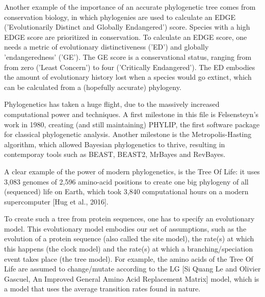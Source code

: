 %
%

Another example of the importance of an accurate phylogenetic tree 
comes from conservation biology, in which phylogenies are used to
calculate an EDGE ('Evolutionarily Distinct and Globally Endangered') 
score. Species with a high EDGE score are prioritized in conservation.
To calculate an EDGE score, one needs a metric of evolutionary 
distinctiveness ('ED') and globally 'endangeredness' ('GE').
The GE score is a conservational status, ranging from from zero ('Least Concern') 
to four ('Critically Endangered'). 
The ED embodies the amount of evolutionary history lost when a species 
would go extinct, which can be calculated from a (hopefully accurate) 
phylogeny.

%
%


Phylogenetics has taken a huge flight, due to the massively increased
computational power and techniques. A first milestone in this file is 
Felsensteyn's work in 1980, creating (and still maintaining) PHYLIP, 
the first software package for classical phylogenetic analysis.
Another milestone is the Metropolis-Hasting algorithm, which 
allowed Bayesian phylogenetics to thrive, resulting in
contemporay tools such as BEAST, BEAST2, MrBayes and RevBayes.

%
%

A clear example of the power of modern phylogenetics,
is the Tree Of Life: it uses 
3,083 genomes of 2,596 amino-acid positions 
to create one big phylogeny of all (sequenced) life on Earth,
which took 3,840 computational hours on a modern supercomputer [Hug et al., 2016].

%
%
%

To create such a tree from protein sequences, one has to specify
an evolutionary model. This evolutionary model embodies our set of
assumptions,
such as the evolution of a protein sequence (also called the site model), 
the rate(s) at which this happens (the clock model) 
and the rate(s) at which a branching/speciation event takes 
place (the tree model). 
For example, the amino acids of the Tree Of Life are assumed to change/mutate
according to the LG [Si Quang 
Le and Olivier Gascuel, An Improved General Amino Acid Replacement Matrix]
model, which is a model that uses the average transition rates found in nature.

